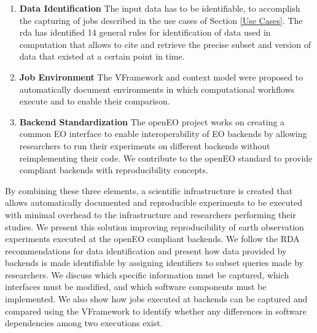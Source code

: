 \documentclass[draft,final]{vutinfth} %
\begin{document}
\begin{enumerate}
	\item \textbf{Data Identification}
	The input data has to be identifiable, to accomplish the capturing of jobs described in the use cases of Section \ref{Use Cases}. The \gls{rda} has identified 14 general rules \cite{rauber2016identification} for identification of data used in computation that allows to cite and retrieve the precise subset and version of data that existed at a certain point in time.
	
	\item \textbf{Job Environment}
	The VFramework \cite{MiksaBiomedical} and context model \cite{MayerOntology} were proposed to automatically document environments in which computational workflows execute and to enable their comparison. 
		
	\item \textbf{Backend Standardization}
	The openEO project \cite{openeo} works on creating a common EO interface to enable interoperability of EO backends by allowing researchers to run their experiments on different backends without reimplementing their code. We contribute to the openEO standard to provide compliant backends with reproducibility concepts.
	
\end{enumerate}

By combining these three elements, a scientific infrastructure is created that allows automatically documented and reproducible experiments to be executed with minimal overhead to the infrastructure and researchers performing their studies. We present this solution improving reproducibility of earth observation experiments executed at the openEO compliant backends. We follow the RDA recommendations for data identification and present how data provided by backends is made identifiable by assigning identifiers to subset queries made by researchers. We discuss which specific information must be captured, which interfaces must be modified, and which software components must be implemented. We also show how jobs executed at backends can be captured and compared using the VFramework to identify whether any differences in software dependencies among two executions exist.
\end{document}
